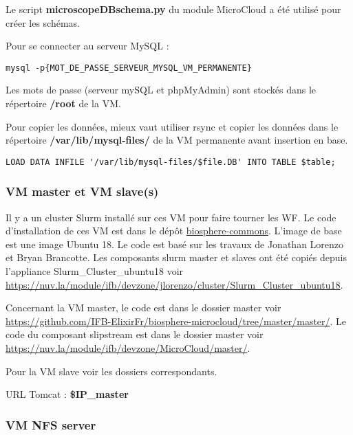 Le script \textbf{microscopeDBschema.py} du module MicroCloud a été utilisé pour créer les schémas.
\newline

Pour se connecter au serveur MySQL :
\begin{lstlisting}[style=bash]
mysql -p{MOT_DE_PASSE_SERVEUR_MYSQL_VM_PERMANENTE}
\end{lstlisting}

Les mots de passe (serveur mySQL et phpMyAdmin) sont stockés dans le répertoire \textbf{/root} de la VM.
\newline 

Pour copier les données, mieux vaut utiliser rsync et copier les données dans le répertoire \textbf{/var/lib/mysql-files/} de la VM permanente avant insertion en base.

\begin{lstlisting}[style=bash]
LOAD DATA INFILE '/var/lib/mysql-files/$file.DB' INTO TABLE $table;
\end{lstlisting}

\subsubsection{VM master et VM slave(s)} \label{master&slave}

Il y a un cluster Slurm installé sur ces VM pour faire tourner les WF. Le code d’installation de ces VM est dans le dépôt \href{https://github.com/IFB-ElixirFr/biosphere-commons}{biosphere-commons}.
L'image de base est une image Ubuntu 18.
Le code est basé sur les travaux de Jonathan Lorenzo et Bryan Brancotte.
Les composants slurm master et slaves ont été copiés depuis l'appliance Slurm\_Cluster\_ubuntu18 voir \url{https://nuv.la/module/ifb/devzone/jlorenzo/cluster/Slurm_Cluster_ubuntu18}.

Concernant la VM master, le code est dans le dossier master voir
\url{https://github.com/IFB-ElixirFr/biosphere-microcloud/tree/master/master/}.
Le code du composant slipstream est dans le dossier master voir \url{https://nuv.la/module/ifb/devzone/MicroCloud/master/}.

Pour la VM slave voir les dossiers correspondants.\newline

URL Tomcat : \textbf{\$IP\_master}

\subsubsection{VM NFS server} \label{nfsserver}


